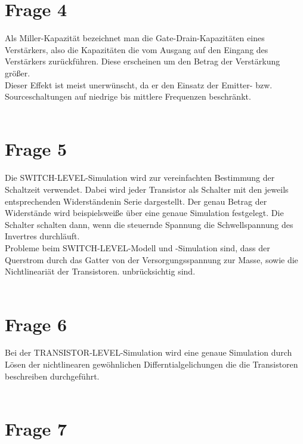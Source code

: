 \documentclass[a4paper]{scrartcl}
\begin{document}
\section*{Frage 4}
Als Miller-Kapazität bezeichnet man die Gate-Drain-Kapazitäten eines Verstärkers, also die Kapazitäten die vom Ausgang auf den Eingang des Verstärkers zurückführen. Diese erscheinen um den Betrag der Verstärkung größer.\\
Dieser Effekt ist meist unerwünscht, da er den Einsatz der Emitter- bzw. Sourceschaltungen auf niedrige bis mittlere Frequenzen beschränkt.
~\\
~\\
\section*{Frage 5}
Die SWITCH-LEVEL-Simulation wird zur vereinfachten Bestimmung der Schaltzeit verwendet. Dabei wird jeder Transistor als Schalter mit den jeweils entsprechenden Widerständenin Serie dargestellt. Der genau Betrag der Widerstände wird beispielsweiße über eine genaue Simulation festgelegt. Die Schalter schalten dann, wenn die steuernde Spannung die Schwellspannung des Invertres durchläuft.\\
Probleme beim SWITCH-LEVEL-Modell und -Simulation sind, dass der Querstrom durch das Gatter von der Versorgungsspannung zur Masse, sowie die Nichtlineariät der Transistoren. unbrücksichtig sind.
~\\
~\\
\section*{Frage 6}
Bei der TRANSISTOR-LEVEL-Simulation wird eine genaue Simulation durch Lösen der nichtlinearen gewöhnlichen Differntialgelichungen die die Transistoren beschreiben durchgeführt.
~\\
~\\
\section*{Frage 7}

~\\
~\\
\end{document}
